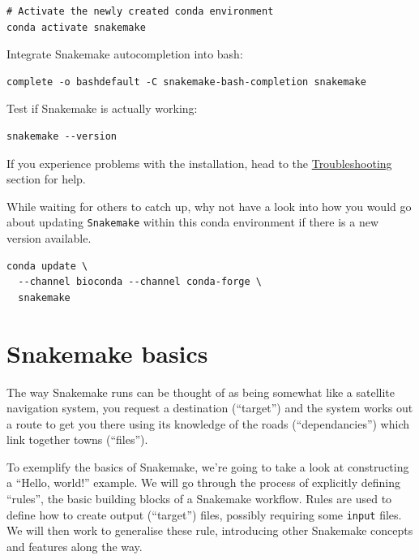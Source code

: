 \begin{steps}

\begin{lstlisting}
# Activate the newly created conda environment
conda activate snakemake
\end{lstlisting}

Integrate Snakemake autocompletion into bash:

\begin{lstlisting}
complete -o bashdefault -C snakemake-bash-completion snakemake
\end{lstlisting}

Test if Snakemake is actually working:

\begin{lstlisting}
snakemake --version
\end{lstlisting}

\end{steps}

If you experience problems with the installation, head to the \hyperref[sec:snake_trouble]{Troubleshooting} section for help.

\begin{bonus}
While waiting for others to catch up, why not have a look into how you would go about updating \texttt{Snakemake}
within this conda environment if there is a new version available.

\begin{answer}
\begin{lstlisting}
conda update \
  --channel bioconda --channel conda-forge \
  snakemake
\end{lstlisting}
\end{answer}

\end{bonus}


\section{Snakemake basics}

The way Snakemake runs can be thought of as being somewhat like a satellite navigation system, you request a destination
(``target'') and the system works out a route to get you there using its knowledge of the roads (``dependancies'') which
link together towns (``files'').

To exemplify the basics of Snakemake, we're going to take a look at constructing a ``Hello, world!'' example. We will go
through the process of explicitly defining ``rules'', the basic building blocks of a Snakemake workflow. Rules are used to
define how to create output (``target'') files, possibly requiring some \texttt{input} files. We will then work to
generalise these rule, introducing other Snakemake concepts and features along the way.

